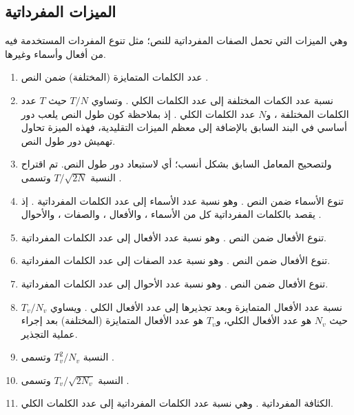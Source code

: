 \subsection{الميزات المفرداتية }
وهي الميزات التي تحمل الصفات المفرداتية للنص؛
مثل تنوع المفردات المستخدمة فيه من أفعال وأسماء وغيرها.
\begin{enumerate}[resume]
	\item 
	عدد الكلمات المتمايزة (المختلفة) ضمن النص .
	\item 
	نسبة عدد الكمات المختلفة إلى عدد الكلمات الكلي .
	وتساوي $T/N$ حيث $T$ عدد الكلمات المختلفة ،
	و$N$ عدد الكلمات الكلي .
	إذ بملاحظة كون طول النص يلعب دور أساسي في البند السابق بالإضافة إلى معظم الميزات التقليدية،
	فهذه الميزة تحاول تهميش دور طول النص.
	\item 
	ولتصحيح المعامل السابق بشكل أنسب؛ أي لاستبعاد دور طول النص.
	تم اقتراح النسبة $T/\sqrt{2N}$ وتسمى .
	\item 
	تنوع الأسماء ضمن النص .
	وهو نسبة عدد الأسماء إلى عدد الكلمات المفرداتية .
	إذ يقصد بالكلمات المفرداتية كل من الأسماء ، والأفعال ،
	والصفات ، والأحوال .
	\item 
	تنوع الأفعال ضمن النص .
	وهو نسبة عدد الأفعال إلى عدد الكلمات المفرداتية.
	\item 
	تنوع الأفعال ضمن النص .
	وهو نسبة عدد الصفات إلى عدد الكلمات المفرداتية.
	\item 
	تنوع الأفعال ضمن النص .
	وهو نسبة عدد الأحوال إلى عدد الكلمات المفرداتية.
	\item 
	نسبة عدد الأفعال المتمايزة وبعد تجذيرها إلى عدد الأفعال الكلي .
	ويساوي $T_v/N_v$ حيث $N_v$ هو عدد الأفعال الكلي،
	و$T_v$ هو عدد الأفعال المتمايزة (المختلفة) بعد إجراء عملية التجذير.
	\item 
	النسبة $T_v^2/N_v$ وتسمى .
	\item 
	النسبة $T_v/\sqrt{2N_v}$ وتسمى .
	\item 
	الكثافة المفرداتية .
	وهي نسبة عدد الكلمات المفرداتية إلى عدد الكلمات الكلي.
\end{enumerate}



